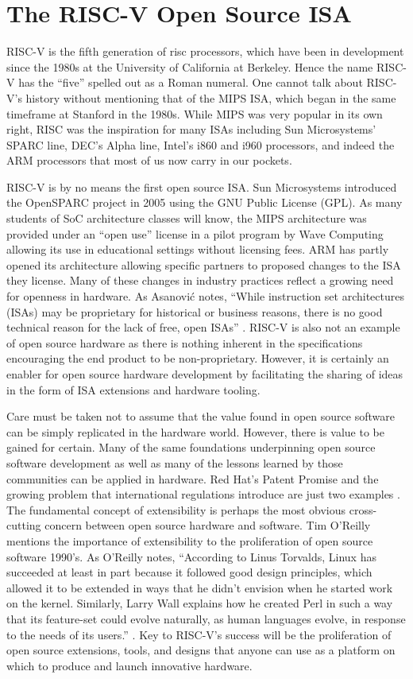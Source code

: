 \section{The RISC-V Open Source ISA}
RISC-V is the fifth generation of \gls{risc} processors, which have been in development since the 1980s at the University of California at Berkeley. Hence the name RISC-V has the ``five'' spelled out as a Roman numeral. One cannot talk about RISC-V's history without mentioning that of the MIPS ISA, which began in the same timeframe at Stanford in the 1980s. While MIPS was very popular in its own right, RISC was the inspiration for many ISAs including Sun Microsystems’ SPARC line, DEC’s Alpha line, Intel’s i860 and i960 processors, and indeed the ARM processors that most of us now carry in our pockets.

RISC-V is by no means the first open source ISA. Sun Microsystems introduced the OpenSPARC project in 2005 using the GNU Public License (GPL)\cite{anemaet2003microprocessor}. As many students of SoC architecture classes will know, the MIPS architecture was provided under an ``open use'' license in a pilot program by Wave Computing allowing its use in educational settings without licensing fees. ARM has partly opened its architecture allowing specific partners to proposed changes to the ISA they license. Many of these changes in industry practices reflect a growing need for openness in hardware. As Asanovi{\'c} notes, ``While instruction set architectures (ISAs) may be proprietary for historical or business reasons, there is no good technical reason for the lack of free, open ISAs'' \cite{asanovic2014instruction}. RISC-V is also not an example of open source hardware as there is nothing inherent in the specifications encouraging the end product to be non-proprietary. However, it is certainly an enabler for open source hardware development by facilitating the sharing of ideas in the form of ISA extensions and hardware tooling.

Care must be taken not to assume that the value found in open source software can be simply replicated in the hardware world. However, there is value to be gained for certain. Many of the same foundations underpinning open source software development as well as many of the lessons learned by those communities can be applied in hardware. Red Hat's Patent Promise and the growing problem that international regulations introduce are just two examples \cite{amye2021}. The fundamental concept of extensibility is perhaps the most obvious cross-cutting concern between open source hardware and software. Tim O'Reilly mentions the importance of extensibility to the proliferation of open source software 1990's. As O'Reilly notes, ``According to Linus Torvalds, Linux has succeeded at least in part because it followed good design principles, which allowed it to be extended in ways that he didn’t envision when he started work on the kernel. Similarly, Larry Wall explains how he created Perl in such a way that its feature-set could evolve naturally, as human languages evolve, in response to the needs of its users.'' \cite{o1999lessons}. Key to RISC-V's success will be the proliferation of open source extensions, tools, and designs that anyone can use as a platform on which to produce and launch innovative hardware.


